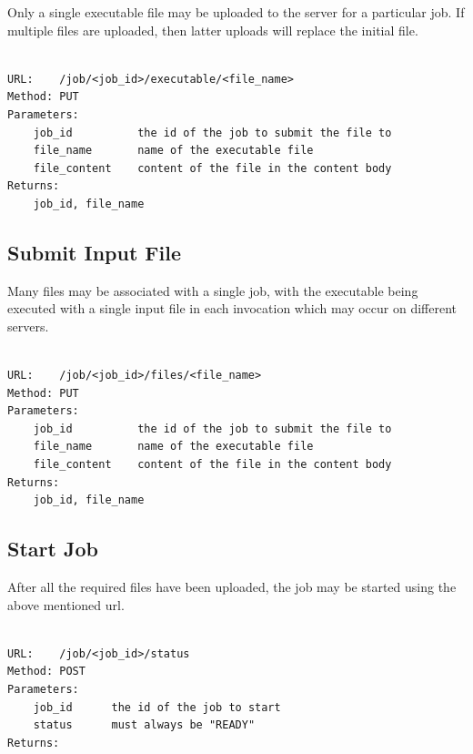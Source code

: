 Only a single executable file may be uploaded to the server for a particular job. If multiple files are uploaded, then latter uploads will replace the initial file.

\begin{adjustwidth}{2.5em}{2.5em}
\begin{verbatim}

URL:    /job/<job_id>/executable/<file_name>    
Method: PUT
Parameters: 
    job_id          the id of the job to submit the file to
    file_name       name of the executable file
    file_content    content of the file in the content body
Returns:    
    job_id, file_name

\end{verbatim}
\end{adjustwidth}

\subsection{Submit Input File}
\label{submitinputfile}

Many files may be associated with a single job, with the executable being executed with a single input file in each invocation which may occur on different servers.

\begin{adjustwidth}{2.5em}{2.5em}
\begin{verbatim}

URL:    /job/<job_id>/files/<file_name>
Method: PUT
Parameters: 
    job_id          the id of the job to submit the file to
    file_name       name of the executable file
    file_content    content of the file in the content body
Returns:        
    job_id, file_name

\end{verbatim}
\end{adjustwidth}

\subsection{Start Job}
\label{startjob}

After all the required files have been uploaded, the job may be started using the above mentioned url.

\begin{adjustwidth}{2.5em}{2.5em}
\begin{verbatim}

URL:    /job/<job_id>/status
Method: POST
Parameters: 
    job_id      the id of the job to start
    status      must always be "READY"
Returns:

\end{verbatim}
\end{adjustwidth}

